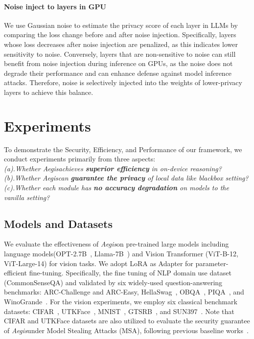 \documentclass{article}
\newcommand{\method}{\textit{Aegis}}
\begin{document}
\paragraph{Noise inject to layers in GPU}
We use Gaussian noise to estimate the privacy score of each layer in LLMs by comparing the loss change before and after noise injection. Specifically, layers whose loss decreases after noise injection are penalized, as this indicates lower sensitivity to noise. Conversely, layers that are non-sensitive to noise can still benefit from noise injection during inference on GPUs, as the noise does not degrade their performance and can enhance defense against model inference attacks. Therefore, noise is selectively injected into the weights of lower-privacy layers to achieve this balance.

\section{Experiments}
To demonstrate the Security, Efficiency, and Performance of our framework, we conduct experiments primarily from three aspects:\\
\textit{(a).Whether \method achieves \textbf{superior efficiency} in on-device reasoning?}\\
\textit{(b).Whether \method can \textbf{guarantee the privacy} of local data like blackbox setting?}\\
\textit{(c).Whether each module has \textbf{no accuracy degradation} on models to the vanilla setting?}

\subsection{Models and Datasets} We evaluate the effectiveness of \method on pre-trained large models including language models(OPT-2.7B~\cite{zhang2022opt}, Llama-7B~\cite{touvron2023llama}) and Vision Transformer (ViT-B-12, ViT-Large-14\cite{zeng2023mpcvit}) for vision tasks. We adopt LoRA\cite{hu2022lora} as Adapter for parameter-efficient fine-tuning. Specifically, the fine tuning of NLP domain use dataset (CommonSenseQA)\cite{hu2023llm_dataset} and validated by six widely-used question-answering benchmarks: ARC-Challenge and ARC-Easy\cite{clark2018think_arc}, HellaSwag~\cite{zellers2019hellaswag}, OBQA~\cite{mihaylov2018obqa}, PIQA~\cite{bisk2020piqa}, and WinoGrande~\cite{sakaguchi2021winogrande}. For the vision experiments, we employ six classical benchmark datasets: CIFAR~\cite{cifar}, UTKFace~\cite{zhang2017age_utkface}, MNIST~\cite{cohen2017emnist}, GTSRB~\cite{stallkamp2012man_gtsrb}, and SUN397~\cite{xiao2010sun_397}. Note that CIFAR and UTKFace datasets are also utilized to evaluate the security guarantee of \method under Model Stealing Attacks (MSA), following previous baseline works~\cite{zhou2023nnsplitter, AnonymousCoder2025Phantom}.
\end{document}
